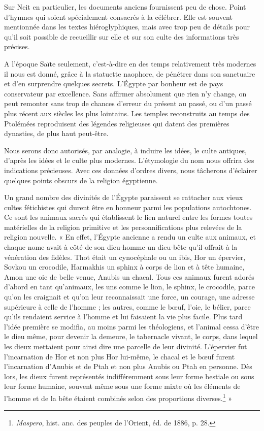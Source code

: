 \documentclass[letterpaper,twocolumn,openany,nodeprecatedcode]{dndbook}
\begin{document}
Sur Neit en particulier, les documents anciens fournissent peu de chose. Point d'hymnes qui soient spécialement consacrés à la célébrer. Elle est souvent mentionnée dans les textes hiéroglyphiques, mais avec trop peu de détails pour qu'il soit possible de recueillir sur elle et sur son culte des informations très précises.

A l'époque Saïte seulement, c'est-à-dire en des temps relativement très modernes il nous est donné, grâce à la statuette naophore, de pénétrer dans son sanctuaire et d'en surprendre quelques secrets. L'Égypte par bonheur est de pays conservateur par excellence. Sans affirmer absolument que rien n'y change, on peut remonter sans trop de chances d'erreur du présent au passé, ou d'un passé plus récent aux siècles les plus lointains. Les temples reconstruits au temps des Ptolémées reproduisent des légendes religieuses qui datent des premières dynasties, de plus haut peut-être.

Nous serons donc autorisés, par analogie, à induire les idées, le culte antiques, d'après les idées et le culte plus modernes. L'étymologie du nom nous offrira des indications précieuses. Avec ces données d'ordres divers, nous tâcherons d'éclairer quelques points obscurs de la religion égyptienne.

Un grand nombre des divinités de l'Égypte paraissent se rattacher aux vieux cultes fétichistes qui durent être en honneur parmi les populations autochtones. Ce sont les animaux sacrés qui établissent le lien naturel entre les formes toutes matérielles de la religion primitive et les personnifications plus relevées de la religion nouvelle. « En effet, l'Égypte ancienne a rendu un culte aux animaux, et chaque nome avait à côté de son dieu-homme un dieu-bête qu'il offrait à la vénération des fidèles. Thot était un cynocéphale ou un ibis, Hor un épervier, Sovkou un crocodile, Harmakhis un sphinx à corps de lion et à tête humaine, Amon une oie de belle venue, Anubis un chacal. Tous ces animaux furent adorés d'abord en tant qu'animaux, les uns comme le lion, le sphinx, le crocodile, parce qu'on les craignait et qu'on leur reconnaissait une force, un courage, une adresse supérieure à celle de l'homme ; les autres, comme le bœuf, l'oie, le bélier, parce qu'ils rendaient service à l'homme et lui faisaient la vie plus facile. Plus tard l'idée première se modifia, au moins parmi les théologiens, et l'animal cessa d'être le dieu même, pour devenir la demeure, le tabernacle vivant, le corps, dans lequel les dieux mettaient pour ainsi dire une parcelle de leur divinité. L'épervier fut l'incarnation de Hor et non plus Hor lui-même, le chacal et le bœuf furent l'incarnation d'Anubis et de Ptah et non plus Anubis ou Ptah en personne. Dès lors, les dieux furent représentés indifféremment sous leur forme bestiale ou sous leur forme humaine, souvent même sous une forme mixte où les éléments de l'homme et de la bête étaient combinés selon des proportions diverses.\footnote{\emph{Maspero}, hist. anc. des peuples de l'Orient, éd. de 1886, p. 28.} »
\end{document}
